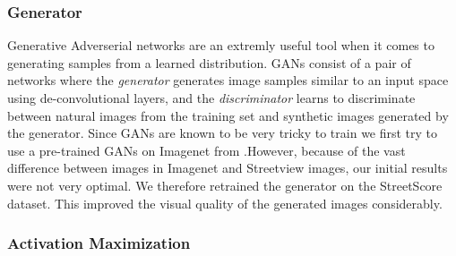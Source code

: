  \subsubsection{Generator}
 Generative Adverserial networks are an extremly useful tool when it comes to generating samples from a learned distribution\cite{radford2015unsupervised}. GANs consist of a %
 pair of networks where the \textit{generator} %
 generates image samples similar to an input space using de-convolutional layers, and the \textit{discriminator} learns to discriminate between natural images from the training set and synthetic images generated by the generator. %
Since GANs are known to be very tricky to train \cite{gulrajani2017improved}  we first try to use a pre-trained GANs on Imagenet from \cite{nguyen2016synthesizing}.However, because of the vast difference between images in Imagenet and Streetview images, our initial results were not very optimal. We therefore retrained the generator on the StreetScore dataset. %
This improved the visual quality of the generated images considerably.%

\subsubsection{Activation Maximization}

